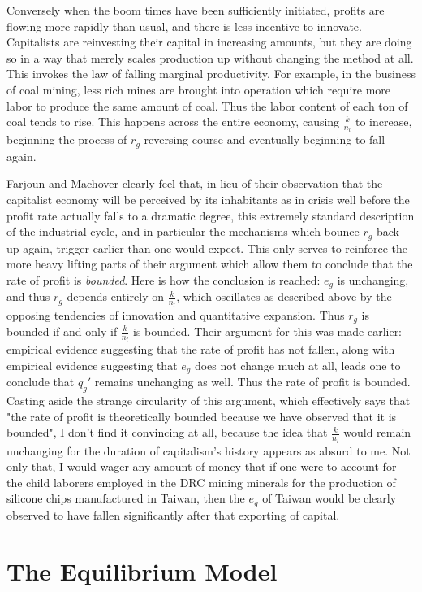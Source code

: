 \documentclass{article}
\theoremstyle{definition}
\theoremstyle{plain}
\theoremstyle{theorem}
\begin{document}
Conversely when the boom times have been sufficiently initiated, profits are flowing more rapidly than usual, and there is less incentive to innovate. Capitalists are reinvesting their capital in increasing amounts, but they are doing so in a way that merely scales production up without changing the method at all. This invokes the law of falling marginal productivity. For example, in the business of coal mining, less rich mines are brought into operation which require more labor to produce the same amount of coal. Thus the labor content of each ton of coal tends to rise. This happens across the entire economy, causing $\frac{k}{n_l}$ to increase, beginning the process of $r_g$ reversing course and eventually beginning to fall again. \par 
Farjoun and Machover clearly feel that, in lieu of their observation that the capitalist economy will be perceived by its inhabitants as in crisis well before the profit rate actually falls to a dramatic degree, this extremely standard description of the industrial cycle, and in particular the mechanisms which bounce $r_g$ back up again, trigger earlier than one would expect. This only serves to reinforce the more heavy lifting parts of their argument which allow them to conclude that the rate of profit is \textit{bounded}. Here is how the conclusion is reached: $e_g$ is unchanging, and thus $r_g$ depends entirely on $\frac{k}{n_l}$, which oscillates as described above by the opposing tendencies of innovation and quantitative expansion. Thus $r_g$ is bounded if and only if $\frac{k}{n_l}$ is bounded. Their argument for this was made earlier: empirical evidence suggesting that the rate of profit has not fallen, along with empirical evidence suggesting that $e_g$ does not change much at all, leads one to conclude that $q_g'$ remains unchanging as well. Thus the rate of profit is bounded. Casting aside the strange circularity of this argument, which effectively says that "the rate of profit is theoretically bounded because we have observed that it is bounded", I don't find it convincing at all, because the idea that $\frac{k}{n_l}$ would remain unchanging for the duration of capitalism's history appears as absurd to me. Not only that, I would wager any amount of money that if one were to account for the child laborers employed in the DRC mining minerals for the production of silicone chips manufactured in Taiwan, then the $e_g$ of Taiwan would be clearly observed to have fallen significantly after that exporting of capital. 
\section{The Equilibrium Model}
\end{document}
